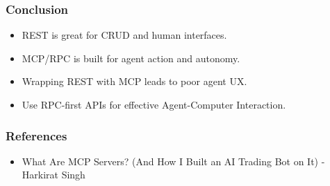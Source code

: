 \begin{frame}[fragile]\frametitle{Conclusion}
\begin{itemize}
  \item REST is great for CRUD and human interfaces.
  \item MCP/RPC is built for agent action and autonomy.
  \item Wrapping REST with MCP leads to poor agent UX.
  \item Use RPC-first APIs for effective Agent-Computer Interaction.
\end{itemize}
\end{frame}






\begin{frame}[fragile]\frametitle{References}
    \begin{itemize}
        \item What Are MCP Servers? (And How I Built an AI Trading Bot on It) - Harkirat Singh
    \end{itemize}
\end{frame}



